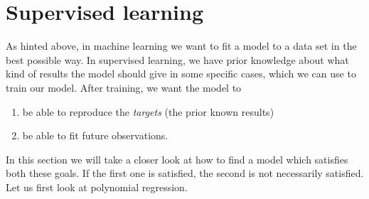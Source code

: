 \section{Supervised learning}
As hinted above, in machine learning we want to fit a model to a data set in the best possible way. In supervised learning, we have prior knowledge about what kind of results the model should give in some specific cases, which we can use to train our model. After training, we want the model to
\begin{enumerate}
	\item be able to reproduce the \textit{targets} (the prior known results)
	\item be able to fit future observations.
\end{enumerate}
In this section we will take a closer look at how to find a model which satisfies both these goals. If the first one is satisfied, the second is not necessarily satisfied. Let us first look at polynomial regression. 

